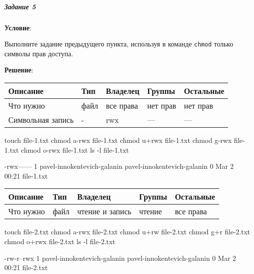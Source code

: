 \subparagraph{Задание 5} \textbf{Условие}:

Выполните задание предыдущего пункта, используя в команде \verb|chmod| только символы прав доступа.

\textbf{Решение}:

\begin{table}[h!]
    \centering
    \begin{tabular}{ | l | l | l | l | l | }
        \hline
        Описание            & Тип   & Владелец  & Группы    & Остальные \\ \hline
        \hline
        Что нужно           & файл  & все права & нет прав  & нет прав  \\ \hline
        Символьная запись 	& -     & rwx 	    & --- 	    & ---       \\ \hline
    \end{tabular}
\end{table}

\begin{BashBox}
    touch file-1.txt
    chmod a-rwx file-1.txt
    chmod u+rwx file-1.txt
    chmod g-rwx file-1.txt
    chmod o-rwx file-1.txt
    ls -l file-1.txt
\end{BashBox}

\begin{OutBox}
    -rwx------ 1 pavel-innokentevich-galanin pavel-innokentevich-galanin 0 Mar  2 00:21 file-1.txt
\end{OutBox}

\begin{table}[h!]
    \centering
    \begin{tabular}{ | l | l | l | l | l | }
        \hline
        Описание            & Тип   & Владелец          & Группы    & Остальные \\ \hline
        \hline
        Что нужно           & файл  & чтение и запись   & чтение    & все права \\ \hline
    \end{tabular}
\end{table}

\begin{BashBox}
    touch file-2.txt
    chmod a-rwx file-2.txt
    chmod u+rw file-2.txt
    chmod g+r file-2.txt
    chmod o+rwx file-2.txt
    ls -l file-2.txt
\end{BashBox}

\begin{OutBox}
    -rw-r--rwx 1 pavel-innokentevich-galanin pavel-innokentevich-galanin 0 Mar  2 00:21 file-2.txt
\end{OutBox}

